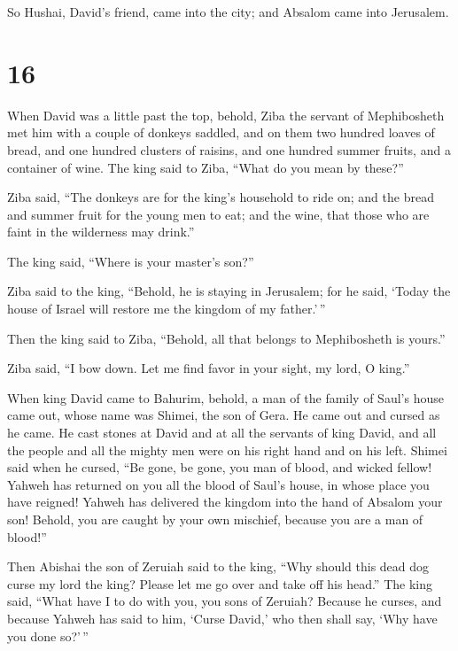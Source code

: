  So Hushai, David's friend, came into the city; and Absalom
came into Jerusalem.

\hypertarget{section-15}{%
\section{16}\label{section-15}}

 When David was a little past the top, behold, Ziba the
servant of Mephibosheth met him with a couple of donkeys saddled, and on
them two hundred loaves of bread, and one hundred clusters of raisins,
and one hundred summer fruits, and a container of wine.  The
king said to Ziba, ``What do you mean by these?''

Ziba said, ``The donkeys are for the king's household to ride on; and
the bread and summer fruit for the young men to eat; and the wine, that
those who are faint in the wilderness may drink.''

 The king said, ``Where is your master's son?''

Ziba said to the king, ``Behold, he is staying in Jerusalem; for he
said, `Today the house of Israel will restore me the kingdom of my
father.'\,''

 Then the king said to Ziba, ``Behold, all that belongs to
Mephibosheth is yours.''

Ziba said, ``I bow down. Let me find favor in your sight, my lord, O
king.''

 When king David came to Bahurim, behold, a man of the
family of Saul's house came out, whose name was Shimei, the son of Gera.
He came out and cursed as he came.  He cast stones at David
and at all the servants of king David, and all the people and all the
mighty men were on his right hand and on his left.  Shimei
said when he cursed, ``Be gone, be gone, you man of blood, and wicked
fellow!  Yahweh has returned on you all the blood of Saul's
house, in whose place you have reigned! Yahweh has delivered the kingdom
into the hand of Absalom your son! Behold, you are caught by your own
mischief, because you are a man of blood!''

 Then Abishai the son of Zeruiah said to the king, ``Why
should this dead dog curse my lord the king? Please let me go over and
take off his head.''  The king said, ``What have I to do
with you, you sons of Zeruiah? Because he curses, and because Yahweh has
said to him, `Curse David,' who then shall say, `Why have you done
so?'\,''

